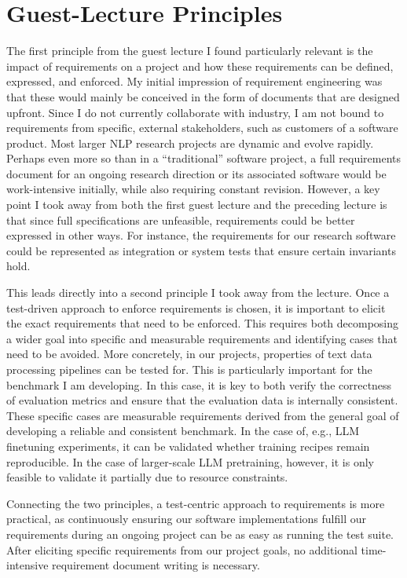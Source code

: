 \documentclass[11pt]{article}
\begin{document}
\section{Guest-Lecture Principles}

The first principle from the guest lecture I found particularly relevant is the impact of requirements on a project and how these requirements can be defined, expressed, and enforced. My initial impression of requirement engineering was that these would mainly be conceived in the form of documents that are designed upfront. Since I do not currently collaborate with industry, I am not bound to requirements from specific, external stakeholders, such as customers of a software product. Most larger NLP research projects are dynamic and evolve rapidly. Perhaps even more so than in a ``traditional'' software project, a full requirements document for an ongoing research direction or its associated software would be work-intensive initially, while also requiring constant revision. However, a key point I took away from both the first guest lecture and the preceding lecture is that since full specifications are unfeasible, requirements could be better expressed in other ways. For instance, the requirements for our research software could be represented as integration or system tests that ensure certain invariants hold.

This leads directly into a second principle I took away from the lecture. Once a test-driven approach to enforce requirements is chosen, it is important to elicit the exact requirements that need to be enforced. This requires both decomposing a wider goal into specific and measurable requirements and identifying cases that need to be avoided. More concretely, in our projects, properties of text data processing pipelines can be tested for. This is particularly important for the benchmark I am developing. In this case, it is key to both verify the correctness of evaluation metrics and ensure that the evaluation data is internally consistent.  These specific cases are measurable requirements derived from the general goal of developing a reliable and consistent benchmark. In the case of, e.g., LLM finetuning experiments, it can be validated whether training recipes remain reproducible. In the case of larger-scale LLM pretraining, however, it is only feasible to validate it partially due to resource constraints.

Connecting the two principles, a test-centric approach to requirements is more practical, as continuously ensuring our software implementations fulfill our requirements during an ongoing project can be as easy as running the test suite. After eliciting specific requirements from our project goals, no additional time-intensive requirement document writing is necessary. 
\end{document}
